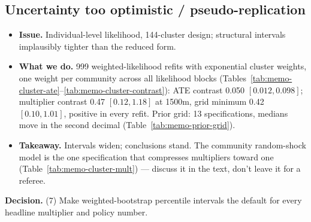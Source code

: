 \documentclass[11pt]{article}
\providecommand{\StructuralRobustnessPath}{appendix/structural-robustness}
\providecommand{\StructuralRobustnessPath}{../appendix/structural-robustness}
\newenvironment{decision}
  {\par\medskip\noindent\begin{minipage}{\linewidth}\color{blue!50!black}\textbf{Decision.} }
  {\end{minipage}\par\medskip}
\begin{document}
\FloatBarrier
\subsection{Uncertainty too optimistic / pseudo-replication}
\begin{itemize}[nosep]
  \item \textbf{Issue.} Individual-level likelihood, 144-cluster design; structural
    intervals implausibly tighter than the reduced form.
  \item \textbf{What we do.} 999 weighted-likelihood refits with exponential cluster
    weights, one weight per community across all likelihood blocks
    (Tables~\ref{tab:memo-cluster-ate}--\ref{tab:memo-cluster-contrast}): ATE contrast
    0.050 $[0.012, 0.098]$; multiplier contrast 0.47 $[0.12, 1.18]$ at 1500m, grid
    minimum 0.42 $[0.10, 1.01]$, positive in every refit. Prior grid: 13 specifications,
    medians move in the second decimal (Table~\ref{tab:memo-prior-grid}).
  \item \textbf{Takeaway.} Intervals widen; conclusions stand. The community
    random-shock model is the one specification that compresses multipliers toward one
    (Table~\ref{tab:memo-cluster-mult}) --- discuss it in the text, don't leave it for a
    referee.
\end{itemize}

\begin{decision}
(7) Make weighted-bootstrap percentile intervals the default for every headline
multiplier and policy number.
\end{decision}

\begin{table}[htbp]
  \centering
  \scriptsize
  \caption{Structural treatment effects: cluster weighted-likelihood bootstrap
    (\texttt{sections/cluster-inference.tex})}
  \label{tab:memo-cluster-ate}
\end{table}

\begin{table}[htbp]
  \centering
  \scriptsize
  \caption{Multipliers under alternative treatments of community dependence}
  \label{tab:memo-cluster-mult}
\end{table}

\begin{table}[htbp]
  \centering
  \scriptsize
  \caption{Paired multiplier contrasts across 999 weighted refits}
  \label{tab:memo-cluster-contrast}
\end{table}
\end{document}
